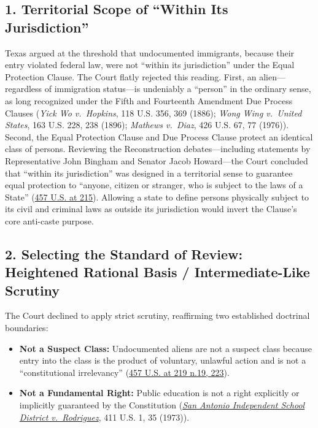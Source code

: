 \documentclass[12pt]{article}
\begin{document}
\subsection*{1. Territorial Scope of ``Within Its Jurisdiction''}
Texas argued at the threshold that undocumented immigrants, because their entry violated federal law, were not ``within its jurisdiction'' under the Equal Protection Clause. The Court flatly rejected this reading. First, an alien---regardless of immigration status---is undeniably a ``person'' in the ordinary sense, as long recognized under the Fifth and Fourteenth Amendment Due Process Clauses (\textit{Yick Wo v.\ Hopkins}, 118 U.S. 356, 369 (1886); \textit{Wong Wing v.\ United States}, 163 U.S. 228, 238 (1896); \textit{Mathews v.\ Diaz}, 426 U.S. 67, 77 (1976)). Second, the Equal Protection Clause and Due Process Clause protect an identical class of persons. Reviewing the Reconstruction debates---including statements by Representative John Bingham and Senator Jacob Howard---the Court concluded that ``within its jurisdiction'' was designed in a territorial sense to guarantee equal protection to ``anyone, citizen or stranger, who is subject to the laws of a State'' (\href{https://www.law.cornell.edu/supremecourt/text/457/202}{457 U.S. at 215}). Allowing a state to define persons physically subject to its civil and criminal laws as outside its jurisdiction would invert the Clause's core anti-caste purpose.

\subsection*{2. Selecting the Standard of Review: Heightened Rational Basis / Intermediate-Like Scrutiny}
The Court declined to apply strict scrutiny, reaffirming two established doctrinal boundaries:
\begin{itemize}
    \item \textbf{Not a Suspect Class:} Undocumented aliens are not a suspect class because entry into the class is the product of voluntary, unlawful action and is not a ``constitutional irrelevancy'' (\href{https://www.law.cornell.edu/supremecourt/text/457/202}{457 U.S. at 219 n.19, 223}).
    \item \textbf{Not a Fundamental Right:} Public education is not a right explicitly or implicitly guaranteed by the Constitution (\href{https://supreme.justia.com/cases/federal/us/411/1/}{\textit{San Antonio Independent School District v.\ Rodriguez}}, 411 U.S. 1, 35 (1973)).
\end{itemize}
\end{document}
